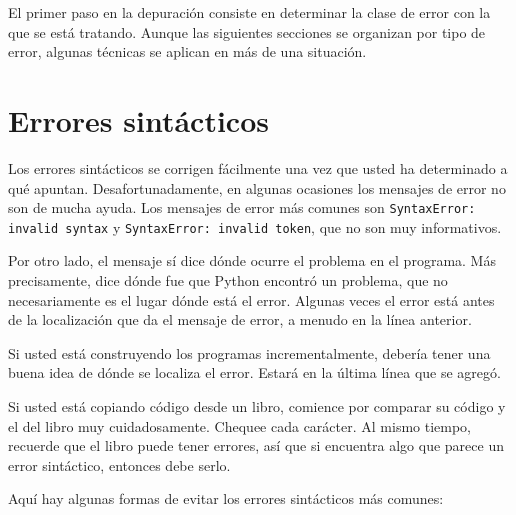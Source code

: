 
El primer paso en la depuración consiste en determinar la clase
de error con la que se está tratando. Aunque las siguientes
secciones se organizan por tipo de error, algunas técnicas
se aplican en más de una situación.

\section{Errores sintácticos}


Los errores sintácticos se corrigen fácilmente una vez que usted
ha determinado a qué apuntan. Desafortunadamente, en algunas ocasiones
los mensajes de error no son de mucha ayuda. Los mensajes de error
más comunes son \texttt{SyntaxError: invalid syntax} y
\texttt{SyntaxError: invalid token}, que no son muy informativos.

Por otro lado, el mensaje sí dice dónde ocurre el problema en el 
programa. Más precisamente, dice dónde fue que Python encontró
un problema, que no necesariamente es el lugar dónde está el
error. Algunas veces el error está antes de la localización
que da el mensaje de error, a menudo en la línea anterior.


Si usted está construyendo los programas incrementalmente, debería
tener una buena idea de dónde se localiza el error. Estará en la
última línea que se agregó.

Si usted está copiando código desde un libro, comience por comparar
su código y el del libro muy cuidadosamente. Chequee cada carácter.
Al mismo tiempo, recuerde que el libro puede tener errores, así que
si encuentra algo que parece un error sintáctico, entonces debe serlo.

Aquí hay algunas formas de evitar los errores sintácticos más comunes:


